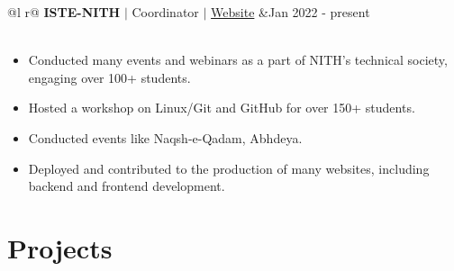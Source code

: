 \documentclass[legalpaper,11pt]{article}
\begin{document}

\begin{tabularx}{\linewidth}{ @{}l r@{} }
\textbf{ISTE-NITH} $|$ Coordinator $|$ \href{https://www.istenith.com/}{Website} &\hfill Jan 2022 - present \\[3.75pt]
 \\
\end{tabularx}

\begin{itemize}[leftmargin=*,noitemsep,topsep=0pt]
    \item Conducted many events and webinars as a part of NITH's technical society, engaging over 100+ students.
    \item Hosted a workshop on Linux/Git and GitHub for over 150+ students.
    \item Conducted events like Naqsh-e-Qadam, Abhdeya.
    \item Deployed and contributed to the production of many websites, including backend and frontend development.
\end{itemize}


\section{Projects}
\end{document}
